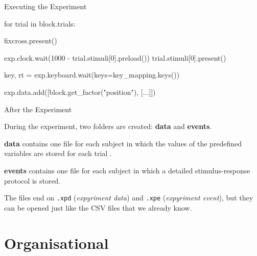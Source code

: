 \begin{frame}[fragile]{Executing the Experiment}

    \begin{pythoncode}
for trial in block.trials:

    fixcross.present()

    exp.clock.wait(1000 - trial.stimuli[0].preload())
    trial.stimuli[0].present()

    key, rt = exp.keyboard.wait(keys=key_mapping.keys())

    exp.data.add([block.get_factor("position"), [...]])
    \end{pythoncode}

\end{frame}


\begin{frame}[fragile]{After the Experiment}

    During the experiment, two folders are created: \textbf{data} and \textbf{events}.

    \vspace{1em}

    \textbf{data} contains one file for each subject in which the values of the predefined variables are stored for each trial .
    
    \vspace{1em}

    \textbf{events} contains one file for each subject in which a detailed stimulus-response protocol is stored.

    \vspace{1em}

    The files end on \texttt{.xpd} (\textit{expyriment data}) and \texttt{.xpe} (\textit{expyriment event}), but they can be opened just like the CSV files that we already know.

\end{frame}


\section{Organisational}


\begin{frame}[plain]
    \sectionpage
\end{frame}


